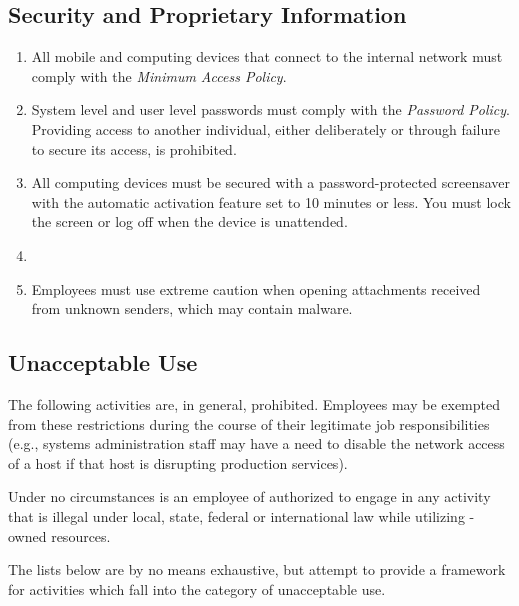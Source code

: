\subsection{Security and Proprietary Information}
\begin{enumerate}
\item
All mobile and computing devices that connect to the internal network must comply with the \textsl{Minimum Access Policy}.%
\item
System level and user level passwords must comply with the \textsl{Password Policy}.  
Providing access to another individual, either deliberately or through failure to secure its access, is prohibited.
\item
All computing devices must be secured with a password-protected screensaver with the automatic activation feature set to 10 minutes or less.  
You must lock the screen or log off when the device is unattended.
\item
{}
\item
Employees must use extreme caution when opening \email{} attachments received from unknown senders, which may contain malware.
\end{enumerate}

\subsection{Unacceptable Use}
The following activities are, in general, prohibited.  
Employees may be exempted from these restrictions during the course of their legitimate job responsibilities (e.g., systems administration staff may have a need to disable the network access of a host if that host is disrupting production services).

Under no circumstances is an employee of \CompanyName{} authorized to engage in any activity that is illegal under local, state, federal or international law while utilizing \CompanyName{}-owned resources.  

The lists below are by no means exhaustive, but attempt to provide a framework for activities which fall into the category of unacceptable use.

